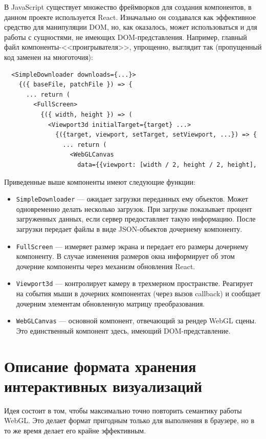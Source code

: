 В JavaScript существует множество фреймворков для создания компонентов, в данном проекте используется React. Изначально он создавался как эффективное средство для манипуляции DOM, но, как оказалось, может использоваться и для работы с сущностями, не имеющих DOM-представления. Например, главный файл компоненты-<<проигрывателя>>, упрощенно, выглядит так (пропущенный код заменен на многоточия):
\begin{verbatim}
  <SimpleDownloader downloads={...}>
    {({ baseFile, patchFile }) => {
      ... return (
        <FullScreen>
          {({ width, height }) => (
            <Viewport3d initialTarget={target} ...>
              {({target, viewport, setTarget, setViewport, ...}) => {
                ... return (
                  <WebGLCanvas
                    data={{viewport: [width / 2, height / 2, height],
\end{verbatim}
Приведенные выше компоненты имеют следующие функции:
\begin{itemize}
\item \texttt{SimpleDownloader} --- ожидает загрузки переданных ему объектов. Может одновременно делать несколько загрузок. При загрузке показывает процент загруженных данных, если сервер предоставляет такую информацию. После загрузки передает файлы в виде JSON-объектов дочернему компоненту.
\item \texttt{FullScreen} --- измеряет размер экрана и передает его размеры дочернему компоненту. В случае изменения размеров окна информирует об этом дочерние компоненты через механизм обновления React.
\item \texttt{Viewport3d} --- контролирует камеру в трехмерном пространстве. Реагирует на события мыши в дочерних компонентах (через вызов callback) и сообщает дочерним элементам обновленную матрицу преобразования.
\item \texttt{WebGLCanvas} --- основной компонент, отвечающий за рендер WebGL сцены. Это единственный компонент здесь, имеющий DOM-представление.
\end{itemize}

\section{Описание формата хранения интерактивных визуализаций}

Идея состоит в том, чтобы максимально точно повторить семантику работы WebGL. Это делает формат пригодным только для выполнения в браузере, но в то же время делает его крайне эффективным.

